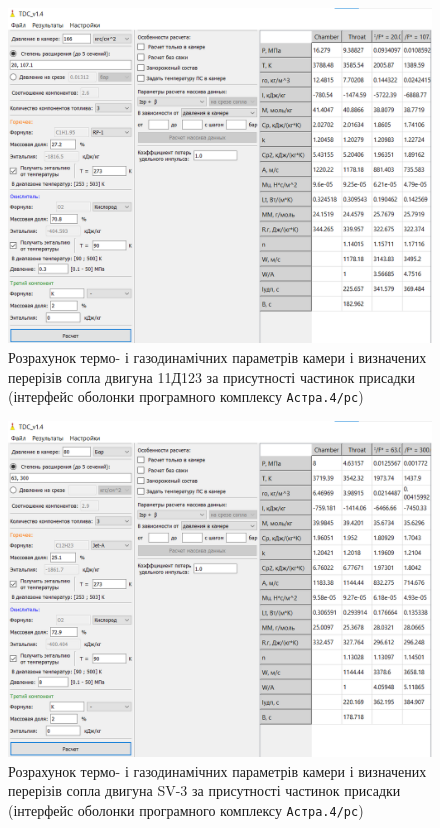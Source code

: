 \begin{figure}
	\centering
	\includegraphics[width=0.5\textheight, angle=0,origin=c]{chapter_3/11D123_add.png}
	\caption{Розрахунок термо- і газодинамічних параметрів камери і визначених перерізів сопла двигуна 11Д123 за присутності частинок присадки (інтерфейс оболонки програмного комплексу \texttt{Астра.4/рс})}
	\label{fig:11D123_add}
\end{figure}

\begin{figure}
	\centering
	\includegraphics[width=0.5\textheight, angle=0,origin=c]{chapter_3/SV-3_add.png}
	\caption{Розрахунок термо- і газодинамічних параметрів камери і визначених перерізів сопла двигуна SV-3 за присутності частинок присадки (інтерфейс оболонки програмного комплексу \texttt{Астра.4/рс})}
	\label{fig:SV-3_add}
\end{figure}



